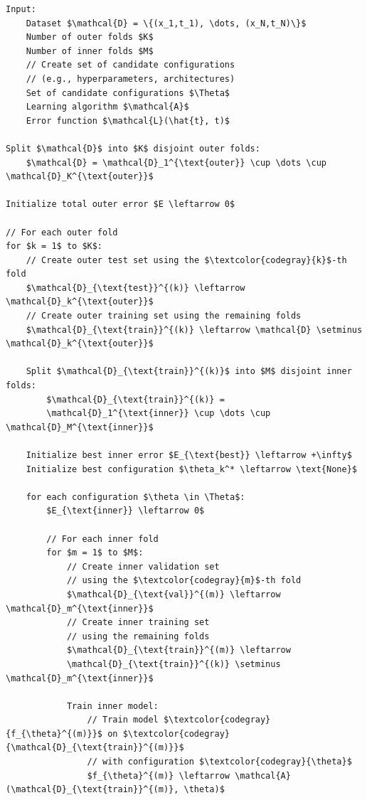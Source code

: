 \begin{lstlisting}[language=pseudo-code,mathescape=true,style={pseudocode-style},caption={Nested Cross-Validation Algorithm}]
Input:
    Dataset $\mathcal{D} = \{(x_1,t_1), \dots, (x_N,t_N)\}$
    Number of outer folds $K$
    Number of inner folds $M$
    // Create set of candidate configurations
    // (e.g., hyperparameters, architectures)
    Set of candidate configurations $\Theta$
    Learning algorithm $\mathcal{A}$
    Error function $\mathcal{L}(\hat{t}, t)$

Split $\mathcal{D}$ into $K$ disjoint outer folds:
    $\mathcal{D} = \mathcal{D}_1^{\text{outer}} \cup \dots \cup \mathcal{D}_K^{\text{outer}}$

Initialize total outer error $E \leftarrow 0$

// For each outer fold
for $k = 1$ to $K$:
    // Create outer test set using the $\textcolor{codegray}{k}$-th fold
    $\mathcal{D}_{\text{test}}^{(k)} \leftarrow \mathcal{D}_k^{\text{outer}}$
    // Create outer training set using the remaining folds
    $\mathcal{D}_{\text{train}}^{(k)} \leftarrow \mathcal{D} \setminus \mathcal{D}_k^{\text{outer}}$

    Split $\mathcal{D}_{\text{train}}^{(k)}$ into $M$ disjoint inner folds:
        $\mathcal{D}_{\text{train}}^{(k)} =
        \mathcal{D}_1^{\text{inner}} \cup \dots \cup \mathcal{D}_M^{\text{inner}}$

    Initialize best inner error $E_{\text{best}} \leftarrow +\infty$
    Initialize best configuration $\theta_k^* \leftarrow \text{None}$

    for each configuration $\theta \in \Theta$:
        $E_{\text{inner}} \leftarrow 0$

        // For each inner fold
        for $m = 1$ to $M$:
            // Create inner validation set
            // using the $\textcolor{codegray}{m}$-th fold
            $\mathcal{D}_{\text{val}}^{(m)} \leftarrow \mathcal{D}_m^{\text{inner}}$
            // Create inner training set
            // using the remaining folds
            $\mathcal{D}_{\text{train}}^{(m)} \leftarrow
            \mathcal{D}_{\text{train}}^{(k)} \setminus \mathcal{D}_m^{\text{inner}}$

            Train inner model:
                // Train model $\textcolor{codegray}{f_{\theta}^{(m)}}$ on $\textcolor{codegray}{\mathcal{D}_{\text{train}}^{(m)}}$
                // with configuration $\textcolor{codegray}{\theta}$
                $f_{\theta}^{(m)} \leftarrow \mathcal{A}(\mathcal{D}_{\text{train}}^{(m)}, \theta)$


\end{lstlisting}
